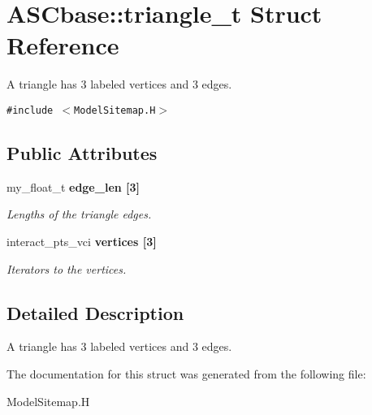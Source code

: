 \section{ASCbase::triangle\_\-t Struct Reference}
\label{structASCbase_1_1triangle__t}
A triangle has 3 labeled vertices and 3 edges.  


{\tt \#include $<$Model\-Sitemap.H$>$}

\subsection*{Public Attributes}
\begin{CompactItemize}
\item 
my\_\-float\_\-t \bf{edge\_\-len} [3]\label{structASCbase_1_1triangle__t_054eeaf8f6d93e76685c52338351cc40}

\begin{CompactList}\small\item\em Lengths of the triangle edges. \item\end{CompactList}\item 
interact\_\-pts\_\-vci \bf{vertices} [3]\label{structASCbase_1_1triangle__t_6c50fcf5765d863b447d3f85d2ed5bdb}

\begin{CompactList}\small\item\em Iterators to the vertices. \item\end{CompactList}\end{CompactItemize}


\subsection{Detailed Description}
A triangle has 3 labeled vertices and 3 edges. 



The documentation for this struct was generated from the following file:\begin{CompactItemize}
\item 
Model\-Sitemap.H\end{CompactItemize}
